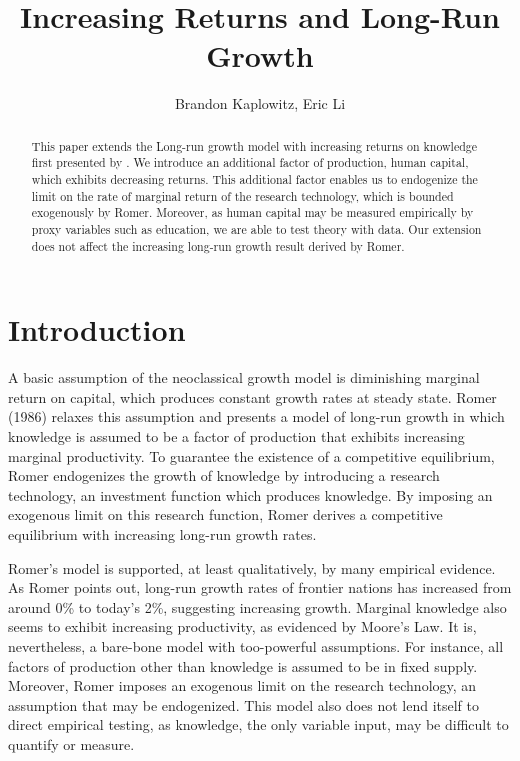 \documentclass{amsart}
\begin{document}
\title{Increasing Returns and Long-Run Growth}

\author[1]{Brandon Kaplowitz, Eric Li}


\begin{abstract}
This paper extends the Long-run growth model with increasing returns on knowledge first presented by \autocite{Romer1986}. We introduce an additional factor of production, human capital, which exhibits decreasing returns. This additional factor enables us to endogenize the limit on the rate of marginal return of the research technology, which is bounded exogenously by Romer. Moreover, as human capital may be measured empirically by proxy variables such as education, we are able to test theory with data. Our extension does not affect the increasing long-run growth result derived by Romer.  

\end{abstract}
\maketitle
\section{Introduction}
A basic assumption of the neoclassical growth model is diminishing marginal return on capital, which produces constant growth rates at steady state. Romer (1986) relaxes this assumption and presents a model of long-run growth in which knowledge is assumed to be a factor of production that exhibits increasing marginal productivity. To guarantee the existence of a competitive equilibrium, Romer endogenizes the growth of knowledge by introducing a research technology, an investment function which produces knowledge. By imposing an exogenous limit on this research function, Romer derives a competitive equilibrium with increasing long-run growth rates. 

Romer's model is supported, at least qualitatively, by many empirical evidence. As Romer points out, long-run growth rates of frontier nations has increased from around 0\% to today's 2\%, suggesting increasing growth. Marginal knowledge also seems to exhibit increasing productivity, as evidenced by Moore's Law. It is, nevertheless, a bare-bone model with too-powerful assumptions. For instance, all factors of production other than knowledge is assumed to be in fixed supply. Moreover, Romer imposes an exogenous limit on the research technology, an assumption that may be endogenized. This model also does not lend itself to direct empirical testing, as knowledge, the only variable input, may be difficult to quantify or measure. 
\end{document}
